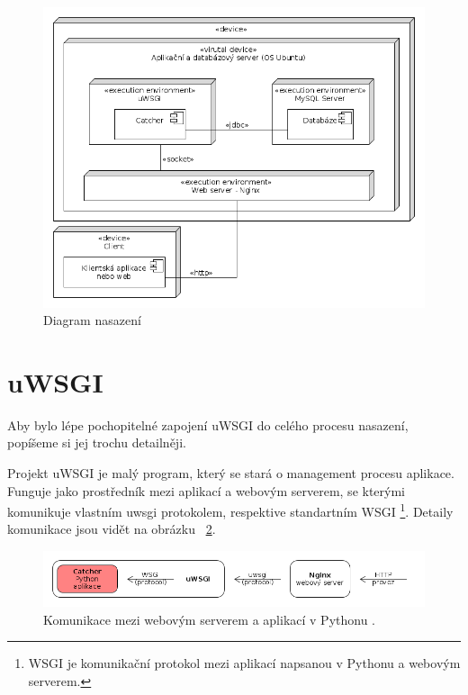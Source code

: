 \begin{figure}[ht!]
\centering
\includegraphics[width=130mm]{./images/diagram-nasazeni.png}
\caption{Diagram nasazení\label{overflow}}
\end{figure}

\section{uWSGI}

\indent

Aby bylo lépe pochopitelné zapojení uWSGI do celého procesu nasazení, popíšeme si jej trochu detailněji.

\medskip

Projekt uWSGI je malý program, který se stará o management procesu aplikace.
Funguje jako prostředník mezi aplikací a webovým serverem,
se kterými komunikuje vlastním uwsgi protokolem, respektive standartním WSGI
\footnote{WSGI je komunikační protokol mezi aplikací napsanou v Pythonu a webovým serverem.}.
Detaily komunikace jsou vidět na obrázku ~\ref{fig:uwsgi}.

\begin{figure}[ht!]
\centering
\includegraphics[width=135mm]{./images/uwsgi.png}
\caption{Komunikace mezi webovým serverem a aplikací v Pythonu \cite{uwsgi}.\label{overflow}}
\label{fig:uwsgi}
\end{figure}

